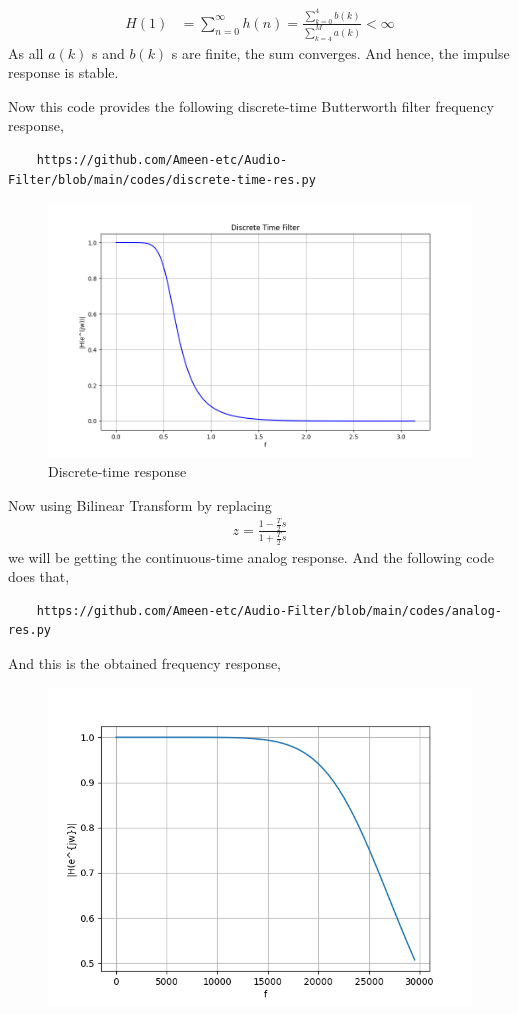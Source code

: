 \documentclass[journal,12pt,twocolumn]{IEEEtran}
\theoremstyle{remark}
\begin{document}
\begin{enumerate}[label=\thesection.\arabic*]
\begin{itemize}
\begin{align}
H(1)&= \sum_{n = 0}^{\infty}h(n)  = \frac{\sum_{k = 0}^{4}b(k)}{\sum_{k = 4}^{M}a(k)}< \infty
\end{align}
As all $a(k)$ s and $b(k)$ s are finite, the sum converges. And hence, the impulse response is stable.
\end{itemize}
Now this code provides the following discrete-time Butterworth filter frequency response,
\begin{lstlisting}
    https://github.com/Ameen-etc/Audio-Filter/blob/main/codes/discrete-time-res.py
\end{lstlisting}
\begin{figure}[h!]
    \centering
    \includegraphics[width=\columnwidth]{figs/discrete-res.png}
    \caption{Discrete-time response}
\end{figure}
Now using Bilinear Transform by replacing 
\begin{align}
    z=\frac{1-\frac{T}{2}s}{1+\frac{T}{2}s}
\end{align}
we will be getting the continuous-time analog response. And the following code does that,
\begin{lstlisting}
    https://github.com/Ameen-etc/Audio-Filter/blob/main/codes/analog-res.py
\end{lstlisting}
And this is the obtained frequency response,
\begin{figure}[h!]
    \centering
    \includegraphics[width=\columnwidth]{figs/analog.png}

\end{figure}
\end{enumerate}
\end{document}
